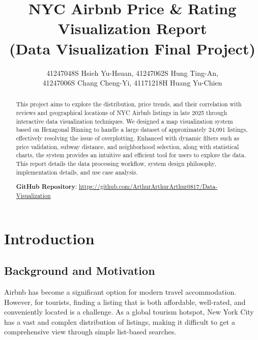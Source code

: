 \documentclass[journal, a4paper]{IEEEtran}
\begin{document}
\title{NYC Airbnb Price \& Rating Visualization Report \\ (Data Visualization Final Project)}

\author{
    41247048S Hsieh Yu-Hsuan,
    41247062S Hung Ting-An, \\
    41247006S Chang Cheng-Yi,
    41171218H Huang Yu-Chien
}


\maketitle

\begin{abstract}
This project aims to explore the distribution, price trends, and their correlation with reviews and geographical locations of NYC Airbnb listings in late 2025 through interactive data visualization techniques. We designed a map visualization system based on Hexagonal Binning to handle a large dataset of approximately 24,091 listings, effectively resolving the issue of overplotting. Enhanced with dynamic filters such as price validation, subway distance, and neighborhood selection, along with statistical charts, the system provides an intuitive and efficient tool for users to explore the data. This report details the data processing workflow, system design philosophy, implementation details, and use case analysis.

\noindent \textbf{GitHub Repository}:
\url{https://github.com/ArthurArthurArthur0817/Data-Visualization}
\end{abstract}

\section{Introduction}
\subsection{Background and Motivation}
Airbnb has become a significant option for modern travel accommodation. However, for tourists, finding a listing that is both affordable, well-rated, and conveniently located is a challenge. As a global tourism hotspot, New York City has a vast and complex distribution of listings, making it difficult to get a comprehensive view through simple list-based searches.
\end{document}
